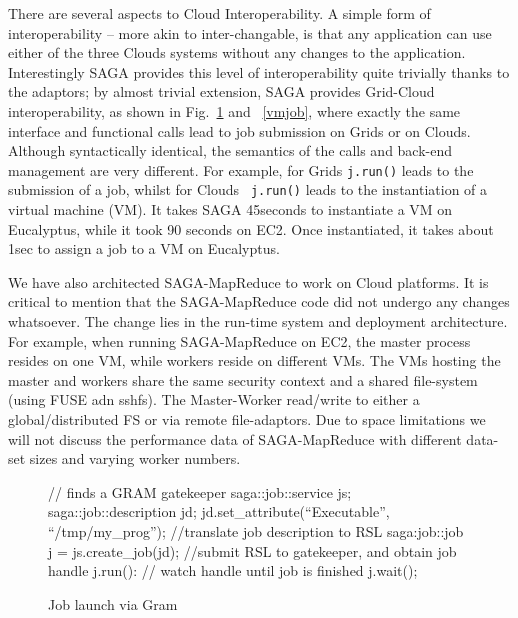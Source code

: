 \documentclass[conference,final]{IEEEtran}
\newcommand{\sagamapreduce }{SAGA-MapReduce }
\begin{document}
There are several aspects to Cloud Interoperability. A simple form of
interoperability -- more akin to inter-changable, is that any
application can use either of the three Clouds systems without any
changes to the application.  Interestingly SAGA provides this level of
interoperability quite trivially thanks to the adaptors; by almost
trivial extension, SAGA provides Grid-Cloud interoperability, as shown
in Fig.~\ref{gramjob} and ~\ref{vmjob}, where exactly the same
interface and functional calls lead to job submission on Grids or on
Clouds. Although syntactically identical, the semantics of the calls
and back-end management are very different.  For example, for Grids
{\tt j.run()} leads to the submission of a job, whilst for Clouds {\tt
  j.run()} leads to the instantiation of a virtual machine (VM).  It
takes SAGA 45seconds to instantiate a VM on Eucalyptus, while it took
90 seconds on EC2. Once instantiated, it takes about 1sec to assign a
job to a VM on Eucalyptus.

We have also architected \sagamapreduce to work on Cloud platforms. It
is critical to mention that the \sagamapreduce code did not undergo
any changes whatsoever. The change lies in the run-time system and
deployment architecture. For example, when running \sagamapreduce on
EC2, the master process resides on one VM, while workers reside on
different VMs. The VMs hosting the master and workers share the same
security context and a shared file-system (using FUSE adn sshfs). The
Master-Worker read/write to either a global/distributed FS
or via remote file-adaptors.  Due to space limitations we will not
discuss the performance data of \sagamapreduce with different data-set
sizes and varying worker numbers.



\begin{figure}[!ht]
 \begin{center}
  \begin{mycode}[label=SAGA Job Launch via GRAM gatekeeper]
   {// finds a GRAM gatekeeper
    saga::job::service js;
    saga::job::description jd;
    jd.set_attribute(``Executable'', ``/tmp/my_prog'');
    //translate job description to RSL
    saga:job::job j = js.create_job(jd);
    //submit RSL to gatekeeper, and obtain job handle
    j.run():
    // watch handle until job is finished
    j.wait();
   } 
  \end{mycode}
  \caption{\label{gramjob}Job launch via Gram }
 \end{center}
\end{figure}
\end{document}
